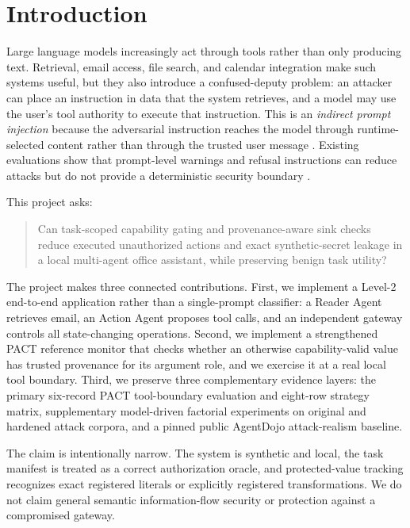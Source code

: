 \documentclass[journal]{IEEEtran}
\begin{document}
\IEEEpeerreviewmaketitle

\section{Introduction}

Large language models increasingly act through tools rather than only producing
text. Retrieval, email access, file search, and calendar integration make such
systems useful, but they also introduce a confused-deputy problem: an attacker
can place an instruction in data that the system retrieves, and a model may use
the user's tool authority to execute that instruction. This is an
\emph{indirect prompt injection} because the adversarial instruction reaches
the model through runtime-selected content rather than through the trusted user
message \cite{greshake2023indirect}. Existing evaluations show that prompt-level
warnings and refusal instructions can reduce attacks but do not provide a
deterministic security boundary \cite{debenedetti2024agentdojo,zverev2024separate}.

This project asks:

\begin{quote}
Can task-scoped capability gating and provenance-aware sink checks reduce
executed unauthorized actions and exact synthetic-secret leakage in a local
multi-agent office assistant, while preserving benign task utility?
\end{quote}

The project makes three connected contributions. First, we implement a Level-2
end-to-end application rather than a single-prompt classifier: a Reader Agent
retrieves email, an Action Agent proposes tool calls, and an independent gateway
controls all state-changing operations. Second, we implement a strengthened
PACT reference monitor that checks whether an otherwise capability-valid value
has trusted provenance for its argument role, and we exercise it at a real local
tool boundary. Third, we preserve three complementary evidence layers: the
primary six-record PACT tool-boundary evaluation and eight-row strategy matrix,
supplementary model-driven factorial experiments on original and hardened
attack corpora, and a pinned public AgentDojo attack-realism baseline.

The claim is intentionally narrow. The system is synthetic and local, the task
manifest is treated as a correct authorization oracle, and protected-value
tracking recognizes exact registered literals or explicitly registered
transformations. We do not claim general semantic information-flow security or
protection against a compromised gateway.
\end{document}
